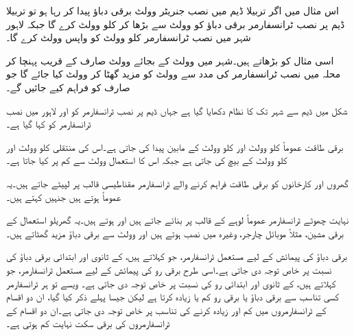 اس مثال میں اگر تربیلا ڈیم میں نصب جنریٹر  وولٹ برقی دباؤ پیدا کر رہا ہو تو تربیلا ڈیم  پر نصب  ٹرانسفارمر برقی دباؤ کو  وولٹ سے بڑھا کر  کلو وولٹ کرے گا جبکہ لاہور شہر میں نصب  ٹرانسفارمر   کلو وولٹ کو واپس  وولٹ کرے گا۔

اسی مثال کو بڑھاتے ہیں۔شہر میں  وولٹ کے بجائے  وولٹ صارف کے قریب  پہنچا کر محلہ میں نصب ٹرانسفارمر  کی مدد سے   وولٹ کو مزید گھٹا کر   وولٹ کیا جائے گا جو صارف کو فراہم کیے جائیں گے۔  

شکل  میں ڈیم سے شہر تک کا نظام دکھایا گیا ہے جہاں ڈیم پر نصب ٹرانسفارمر کو   اور لاہور میں نصب ٹرانسفارمر کو   کہا گیا ہے۔

برقی طاقت عموماً  کلو وولٹ اور   کلو وولٹ کے مابین پیدا کی جاتی ہے۔اس کی منتقلی   کلو وولٹ اور   کلو وولٹ کے بیچ کی جاتی ہے جبکہ اس کا استعمال   وولٹ سے کم پر کیا جاتا ہے۔

گھروں اور کارخانوں کو برقی طاقت فراہم کرنے والے ٹرانسفارمر مقناطیسی قالب پر لپیٹے جاتے ہیں۔یہ عموماً   ہوتے ہیں جنہیں   کہتے ہیں۔

نہایت چھوٹے ٹرانسفارمر عموماً لوہے کے قالب  پر بنائے جاتے ہیں اور  ہوتے ہیں۔یہ گھریلو استعمال کے برقی مشین، مثلاً موبائل چارجر، وغیرہ میں نصب ہوتے ہیں اور  وولٹ سے برقی دباؤ مزید گھٹاتے ہیں۔

برقی دباؤ کی پیمائش کے لیے مستعمل ٹرانسفارمر، جو   کہلاتے ہیں،   کے  ثانوی  اور ابتدائی  برقی دباؤ کی نسبت   پر خاص توجہ دی جاتی ہے۔اسی طرح برقی رو کی  پیمائش کے لیے مستعمل ٹرانسفارمر، جو   کہلاتے ہیں،  کے ثانوی اور  ابتدائی  رو کی نسبت  پر خاص توجہ دی جاتی ہے۔ ویسے تو ہر ٹرانسفارمر کسی تناسب  سے  برقی دباؤ یا برقی رو کم یا زیادہ کرتا ہے لیکن جیسا پہلے ذکر کیا گیا، ان دو اقسام کے ٹرانسفارمروں میں کم اور زیادہ کرنے کی تناسب پر خاص توجہ دی جاتی ہے۔ان دو اقسام کے ٹرانسفارمروں کی برقی سکت نہایت کم ہوتی ہے۔

